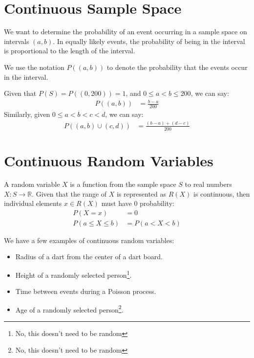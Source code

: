             \section{Continuous Sample Space} %
            \label{sec:continuous_sample_space}
                We want to determine the probability of an event occurring in a sample space on intervals $(a, b)$.
                In equally likely events, the probability of being in the interval is proportional to the length of the interval.

                We use the notation $P((a, b))$ to denote the probability that the events occur in the interval.

                \ex

                Given that $P(S) = P((0, 200)) = 1$, and $0 \le a < b \le 200$, we can say:
                \begin{align*}
                    P((a, b)) &= \frac{b - a}{200}
                \end{align*}
                Similarly, given $0 \le a < b < c < d$, we can say:
                \begin{align*}
                    P( (a, b) \cup (c, d)) &= \frac{(b - a) + (d - c)}{200}
                \end{align*}
            \section{Continuous Random Variables} %
            \label{sec:continuous_random_variables}
                A random variable $X$ is a function from the sample space $S$ to real numbers $X : S \to \mathbb{R}$.
                Given that the range of $X$ is represented as $R(X)$ is continuous, then individual elements $x \in R(X)$ must have $0$ probability:
                \begin{align*}
                    P(X = x) &= 0 \\
                    P(a \le X \le b) &= P(a < X < b)
                \end{align*}

                \ex

                We have a few examples of continuous random variables:
                \begin{itemize}
                    \item Radius of a dart from the center of a dart board.
                    \item Height of a randomly selected person\footnote{No, this doesn't need to be random}.
                    \item Time between events during a Poisson process.
                    \item Age of a randomly selected person\footnote{No, this doesn't need to be random}.
                \end{itemize}
